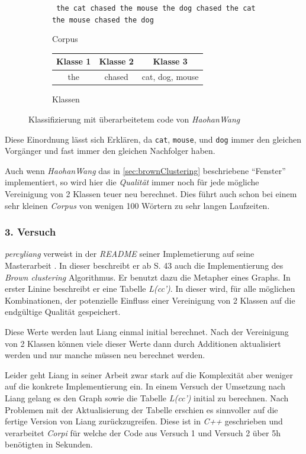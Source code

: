         \begin{figure}[H]
			\centering
            \begin{subfigure}{.45\textwidth}
                \centering
  				\texttt{
                the cat chased the mouse \linebreak
  				the dog chased the cat \linebreak
  				the mouse chased the dog}
                \caption{Corpus}
            \end{subfigure}
            \begin{subfigure}{.45\textwidth}
                \centering
                \begin{tabular}{ c | c | c }
                	Klasse 1 & Klasse 2 & Klasse 3 \\ \hline
                    the & chased & cat, dog, mouse \\
                \end{tabular}
  				\caption{Klassen}
            \end{subfigure}
            \caption{Klassifizierung mit überarbeitetem code von \emph{HaohanWang}}
			\label{fig:clusterCatDogAndMouse}
		\end{figure}

		Diese Einordnung lässt sich Erklären, da \texttt{cat}, \texttt{mouse}, und \texttt{dog} immer den gleichen Vorgänger und fast immer den gleichen Nachfolger haben.


		Auch wenn \emph{HaohanWang} das in \autoref{sec:brownClustering} beschriebene \enquote{Fenster} implementiert, so wird hier die \emph{Qualität} immer noch für jede mögliche Vereinigung von 2 Klassen teuer neu berechnet. Dies führt auch schon bei einem sehr kleinen \emph{Corpus} von wenigen 100 Wörtern zu sehr langen Laufzeiten.
	
    \newpage
	\subsubsection*{3. Versuch}
    \label{sec:thirdTry}
        \emph{percyliang} verweist in der \emph{README} seiner Implemetierung auf seine Masterarbeit \parencite{percyliang:meng}. In dieser beschreibt er ab S. 43 auch die Implementierung des \emph{Brown clustering} Algorithmus. Er benutzt dazu die Metapher eines Graphs. In erster Linine beschreibt er eine Tabelle \emph{L(cc')}. In dieser wird, für alle möglichen Kombinationen, der potenzielle Einfluss einer Vereinigung von 2 Klassen auf die endgültige Qualität gespeichert. \parencite[S. 47]{percyliang:meng}
  
		Diese Werte werden laut Liang einmal initial berechnet. Nach der Vereinigung von 2 Klassen können viele dieser Werte dann durch Additionen aktualisiert werden und nur manche müssen neu berechnet werden. 

		Leider geht Liang in seiner Arbeit zwar stark auf die Komplexität aber weniger auf die konkrete Implementierung ein. In einem Versuch der Umsetzung nach Liang gelang es den Graph sowie die Tabelle \emph{L(cc')} initial zu berechnen. Nach Problemen mit der Aktualisierung der Tabelle erschien es sinnvoller auf die fertige Version von Liang zurückzugreifen. Diese ist in \emph{C++} geschrieben und verarbeitet \emph{Corpi} für welche der Code aus Versuch 1 und Versuch 2 über 5h benötigten in Sekunden. 
